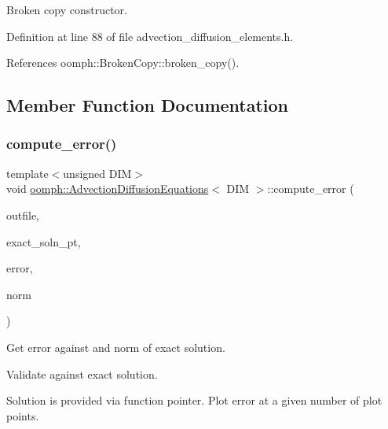 Broken copy constructor. 



Definition at line 88 of file advection\+\_\+diffusion\+\_\+elements.\+h.



References oomph\+::\+Broken\+Copy\+::broken\+\_\+copy().



\subsection{Member Function Documentation}
\mbox{\label{classoomph_1_1AdvectionDiffusionEquations_acb1fcfb29911210ad7c0bc252f0ed665}} 
\subsubsection{\texorpdfstring{compute\+\_\+error()}{compute\_error()}\hspace{0.1cm}{\footnotesize\ttfamily [1/2]}}
{\footnotesize\ttfamily template$<$unsigned D\+IM$>$ \\
void \hyperlink{classoomph_1_1AdvectionDiffusionEquations}{oomph\+::\+Advection\+Diffusion\+Equations}$<$ D\+IM $>$\+::compute\+\_\+error (\begin{DoxyParamCaption}\item[{std\+::ostream \&}]{outfile,  }\item[{\hyperlink{classoomph_1_1FiniteElement_a690fd33af26cc3e84f39bba6d5a85202}{Finite\+Element\+::\+Steady\+Exact\+Solution\+Fct\+Pt}}]{exact\+\_\+soln\+\_\+pt,  }\item[{double \&}]{error,  }\item[{double \&}]{norm }\end{DoxyParamCaption})\hspace{0.3cm}{\ttfamily [virtual]}}



Get error against and norm of exact solution. 

Validate against exact solution.

Solution is provided via function pointer. Plot error at a given number of plot points. 

